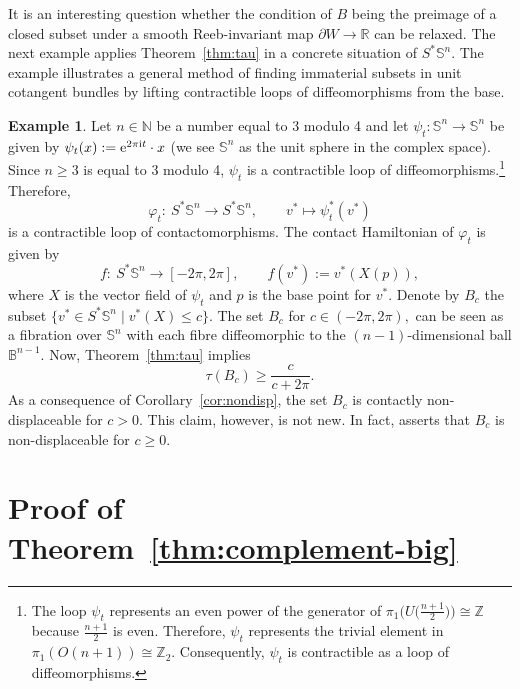 \documentclass[pdftex]{sigma}
\numberwithin{equation}{section}
\theoremstyle{definition}
\newtheorem{Example}[Theorem]{Example}
\begin{document}
It is an interesting question whether the condition of $B$ being the preimage of a closed subset under a smooth Reeb-invariant map $\partial W\to \mathbb{R}$ can be relaxed.
The next example applies Theorem~\ref{thm:tau} in a concrete situation of $S^\ast \mathbb{S}^n$. The example illustrates a general method of finding immaterial subsets in unit cotangent bundles by lifting contractible loops of diffeomorphisms from the base.

\begin{Example}
Let $n\in\mathbb{N}$ be a number equal to 3 modulo 4 and let $\psi_t\colon \mathbb{S}^n\to\mathbb{S}^n$ be given by $\psi_t(x):= {\rm e}^{2\pi {\rm i} t}\cdot x$ (we see $\mathbb{S}^n$ as the unit sphere in the complex space). Since $n\geqslant 3$ is equal to 3 modulo 4, $\psi_t$ is a contractible loop of diffeomorphisms.\footnote{The loop $\psi_t$ represents an even power of the generator of $\pi_1\bigl(U\bigl(\frac{n+1}{2}\bigr)\bigr)\cong\mathbb{Z}$ because $\frac{n+1}{2}$ is even. Therefore, $\psi_t$ represents the trivial element in $\pi_1(O(n+1))\cong\mathbb{Z}_2$. Consequently, $\psi_t$ is contractible as a loop of diffeomorphisms.} Therefore,
\[
\varphi_t\colon \ S^\ast\mathbb{S}^n\to S^\ast\mathbb{S}^n, \qquad v^\ast\mapsto \psi^\ast_t(v^\ast)
\]
is a contractible loop of contactomorphisms. The contact Hamiltonian of $\varphi_t$ is given by
\[
f\colon \ S^\ast\mathbb{S}^n\to[-2\pi, 2\pi], \qquad f(v^\ast):= v^\ast(X(p)),
\]
where $X$ is the vector field of $\psi_t$ and $p$ is the base point for $v^\ast$. Denote by $B_c$ the subset $\{v^\ast\in S^\ast\mathbb{S}^n\mid v^\ast(X)\leqslant c\}$. The set $B_c$ for $c\in(-2\pi, 2\pi), $ can be seen as a fibration over $\mathbb{S}^n$ with each fibre diffeomorphic to the $(n-1)$-dimensional ball $\mathbb{B}^{n-1}$. Now, Theorem~\ref{thm:tau} implies
\[ \tau(B_c)\geqslant \frac{c}{c+2\pi}. \]
As a consequence of Corollary~\ref{cor:nondisp}, the set $B_c$ is contactly non-displaceable for $c>0$. This claim, however, is not new. In fact, \cite[Example~2.11]{sun2026contact} asserts that $B_c$ is non-displaceable for $c\geqslant 0$.
\end{Example}

\section{Proof of Theorem~\ref{thm:complement-big}}\label{sec:proofSH}
\end{document}
